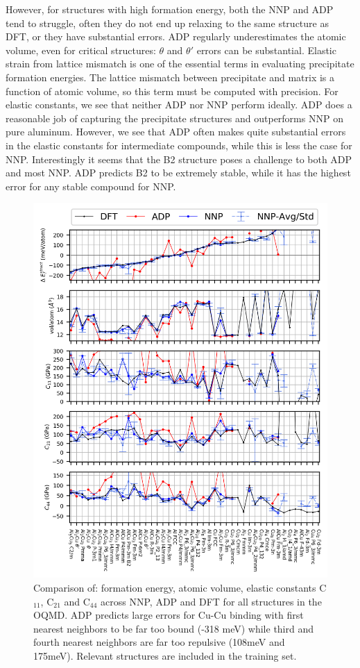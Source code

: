 \documentclass{article}
\begin{document}
However, for structures with high formation energy, both the NNP and ADP tend to struggle, often they do not end up relaxing to the same structure as DFT, or they have substantial errors.
ADP regularly underestimates the atomic volume, even for critical structures: $\theta$ and $\theta'$ errors can be substantial.
Elastic strain from lattice mismatch is one of the essential terms in evaluating precipitate formation energies.
The lattice mismatch between precipitate and matrix is a function of atomic volume, so this term must be computed with precision.  
For elastic constants, we see that neither ADP nor NNP perform ideally.
ADP does a reasonable job of capturing the precipitate structures and outperforms NNP on pure aluminum.
However, we see that ADP often makes quite substantial errors in the elastic constants for intermediate compounds, while this is less the case for NNP. Interestingly it seems that the B2 structure poses a challenge to both ADP and most NNP.
ADP predicts B2 to be extremely stable, while it has the highest error for any stable compound for NNP. 


\begin{figure}[H]%
\centering%
\includegraphics[width=1\textwidth,center]{figures/matparam_stats1.png}%
\caption{Comparison of: formation energy, atomic volume, elastic constants C$_{11}$, C$_{21}$ and C$_{44}$ across NNP, ADP and DFT for all structures in the OQMD.
ADP predicts large errors for Cu-Cu binding with first nearest neighbors to be far too bound (-318 meV)
while third and fourth nearest neighbors are far too repulsive (108meV and 175meV). 
Relevant structures are included in the training set. }
\label{fig:matparam_stats1}
\end{figure}
\end{document}
